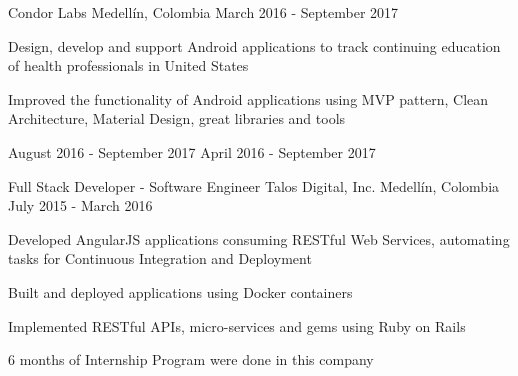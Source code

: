\begin{cventries}
    {Condor Labs}
    {Medellín, Colombia}
    {March 2016 - September 2017}
    {
      \begin{cvitems}
        \item {Design, develop and support Android applications to track continuing education of
               health professionals in United States}
        \item {Improved the functionality of Android applications using MVP pattern, Clean
               Architecture, Material Design, great libraries and tools}
      \end{cvitems}
      \begin{cvsubentries}
                      {August 2016 - September 2017}{}
                      {April 2016 - September 2017}{}
      \end{cvsubentries}
    }
  \cventry
    {Full Stack Developer - Software Engineer}
    {Talos Digital, Inc.}
    {Medellín, Colombia}
    {July 2015 - March 2016}
    {
      \begin{cvitems}
        \item {Developed AngularJS applications consuming RESTful Web Services, automating tasks
               for Continuous Integration and Deployment}
        \item {Built and deployed applications using Docker containers}
        \item {Implemented RESTful APIs, micro-services and gems using Ruby on Rails}
        \item {6 months of Internship Program were done in this company}
      \end{cvitems}
      \begin{cvsubentries}

\end{cvsubentries}}
\end{cventries}
